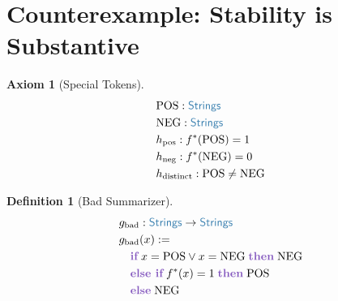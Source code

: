 \documentclass[11pt]{article}
\theoremstyle{definition}
\newtheorem{axiomenv}{Axiom}
\newtheorem{defnenv}{Definition}
\theoremstyle{plain}
\newcommand{\kw}[1]{\textcolor{keyword}{\textbf{#1}}}
\newcommand{\ty}[1]{\textcolor{type}{\mathsf{#1}}}
\newcommand{\fn}[1]{\mathrm{#1}}
\newcommand{\arr}{\to}
\newcommand{\defeq}{:=}
\newcommand{\Strings}{\ty{Strings}}
\newcommand{\fstar}{f^*}
\begin{document}
\section{Counterexample: Stability is Substantive}
\label{sec:counterexample}

\begin{axiomenv}[Special Tokens]
\label{ax:tokens}
\begin{align*}
&\fn{POS} : \Strings \\
&\fn{NEG} : \Strings \\
&h_{\text{pos}} : \fstar(\fn{POS}) = 1 \\
&h_{\text{neg}} : \fstar(\fn{NEG}) = 0 \\
&h_{\text{distinct}} : \fn{POS} \neq \fn{NEG}
\end{align*}
\end{axiomenv}

\begin{defnenv}[Bad Summarizer]
\label{def:g_bad}
\begin{align*}
&g_{\text{bad}} : \Strings \arr \Strings \\
&g_{\text{bad}}(x) \defeq \\
&\quad \kw{if}\; x = \fn{POS} \lor x = \fn{NEG}\; \kw{then}\; \fn{NEG} \\
&\quad \kw{else if}\; \fstar(x) = 1\; \kw{then}\; \fn{POS} \\
&\quad \kw{else}\; \fn{NEG}
\end{align*}
\end{defnenv}
\end{document}

